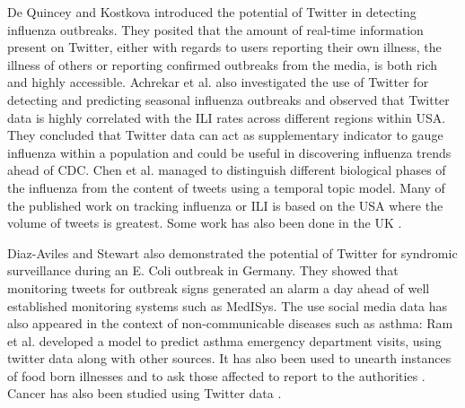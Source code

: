 \documentclass[10pt,letterpaper]{article}
\begin{document}
De Quincey  and Kostkova \cite{REF1} introduced the potential of Twitter in detecting influenza outbreaks. They posited that the amount of real-time information present on Twitter, either with regards to users reporting their own illness, the illness of others or reporting confirmed outbreaks from the media, is both rich and highly accessible. Achrekar et al. \cite{REF4} also investigated the use of Twitter for detecting and predicting seasonal influenza outbreaks and observed that Twitter data is highly correlated with the ILI rates across different regions within USA. They concluded that Twitter data can act as supplementary indicator to gauge influenza within a population and could be useful in discovering influenza trends ahead of CDC.   Chen et al. \cite{REF45,REF44} managed to  distinguish different biological phases of the influenza from the content of tweets using a temporal topic model. Many of the published work on tracking influenza or ILI is based on the USA where the volume of tweets is greatest. Some work has also been done in the UK \cite{REF46,REF47}. 

Diaz-Aviles and Stewart \cite{REF3} also demonstrated the potential of Twitter for syndromic surveillance during an E. Coli outbreak in Germany. They showed that monitoring tweets for outbreak signs generated an alarm a day ahead of well established monitoring systems such as MedISys. The use social media data has also appeared in the context of  non-communicable diseases such as asthma:  Ram et al. \cite{REF48} developed a model to predict asthma emergency department visits, using twitter data along with other sources. It has also been used to unearth instances of food born illnesses and to ask those affected to report to the authorities \cite{REF49}.  Cancer has also been studied using Twitter data \cite{REF50}. 
\end{document}
